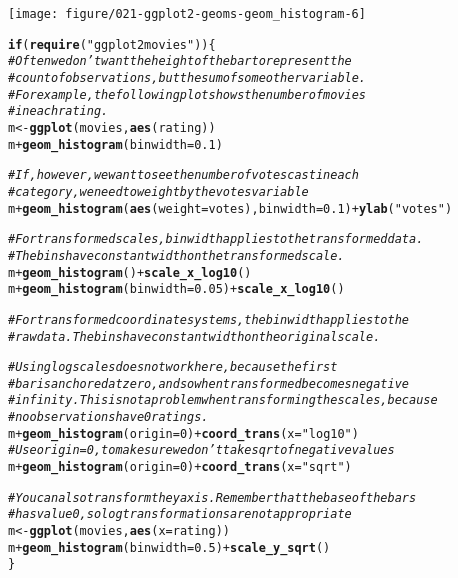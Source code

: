 \documentclass[a4paper,titlepage]{tufte-handout}\usepackage[]{graphicx}\usepackage[]{color}
\makeatletter
\def\maxwidth{ %
  \ifdim\Gin@nat@width>\linewidth
    \linewidth
  \else
    \Gin@nat@width
  \fi
}
\newcommand{\hlnum}[1]{\textcolor[rgb]{0.686,0.059,0.569}{#1}}%
\newcommand{\hlstr}[1]{\textcolor[rgb]{0.192,0.494,0.8}{#1}}%
\newcommand{\hlcom}[1]{\textcolor[rgb]{0.678,0.584,0.686}{\textit{#1}}}%
\newcommand{\hlopt}[1]{\textcolor[rgb]{0,0,0}{#1}}%
\newcommand{\hlstd}[1]{\textcolor[rgb]{0.345,0.345,0.345}{#1}}%
\newcommand{\hlkwa}[1]{\textcolor[rgb]{0.161,0.373,0.58}{\textbf{#1}}}%
\newcommand{\hlkwb}[1]{\textcolor[rgb]{0.69,0.353,0.396}{#1}}%
\newcommand{\hlkwc}[1]{\textcolor[rgb]{0.333,0.667,0.333}{#1}}%
\newcommand{\hlkwd}[1]{\textcolor[rgb]{0.737,0.353,0.396}{\textbf{#1}}}%
\newenvironment{kframe}{%
 \def\at@end@of@kframe{}%
 \ifinner\ifhmode%
  \def\at@end@of@kframe{\end{minipage}}%
  \begin{minipage}{\columnwidth}%
 \fi\fi%
 \def\FrameCommand##1{\hskip\@totalleftmargin \hskip-\fboxsep
 \colorbox{shadecolor}{##1}\hskip-\fboxsep
     \hskip-\linewidth \hskip-\@totalleftmargin \hskip\columnwidth}%
 \MakeFramed {\advance\hsize-\width
   \@totalleftmargin\z@ \linewidth\hsize
   \@setminipage}}%
 {\par\unskip\endMakeFramed%
 \at@end@of@kframe}
\newenvironment{knitrout}{}{} %
\makeatother
\begin{document}
\begin{knitrout}
\begin{kframe}
\begin{alltt}
\end{alltt}
\end{kframe}
\texttt{[image: figure/021-ggplot2-geoms-geom\_histogram-6]} 
\begin{kframe}\begin{alltt}
\hlkwa{if} \hlstd{(}\hlkwd{require}\hlstd{(}\hlstr{"ggplot2movies"}\hlstd{)) \{}
\hlcom{# Often we don't want the height of the bar to represent the}
\hlcom{# count of observations, but the sum of some other variable.}
\hlcom{# For example, the following plot shows the number of movies}
\hlcom{# in each rating.}
\hlstd{m} \hlkwb{<-} \hlkwd{ggplot}\hlstd{(movies,} \hlkwd{aes}\hlstd{(rating))}
\hlstd{m} \hlopt{+} \hlkwd{geom_histogram}\hlstd{(}\hlkwc{binwidth} \hlstd{=} \hlnum{0.1}\hlstd{)}

\hlcom{# If, however, we want to see the number of votes cast in each}
\hlcom{# category, we need to weight by the votes variable}
\hlstd{m} \hlopt{+} \hlkwd{geom_histogram}\hlstd{(}\hlkwd{aes}\hlstd{(}\hlkwc{weight} \hlstd{= votes),} \hlkwc{binwidth} \hlstd{=} \hlnum{0.1}\hlstd{)} \hlopt{+} \hlkwd{ylab}\hlstd{(}\hlstr{"votes"}\hlstd{)}

\hlcom{# For transformed scales, binwidth applies to the transformed data.}
\hlcom{# The bins have constant width on the transformed scale.}
\hlstd{m} \hlopt{+} \hlkwd{geom_histogram}\hlstd{()} \hlopt{+} \hlkwd{scale_x_log10}\hlstd{()}
\hlstd{m} \hlopt{+} \hlkwd{geom_histogram}\hlstd{(}\hlkwc{binwidth} \hlstd{=} \hlnum{0.05}\hlstd{)} \hlopt{+} \hlkwd{scale_x_log10}\hlstd{()}

\hlcom{# For transformed coordinate systems, the binwidth applies to the}
\hlcom{# raw data. The bins have constant width on the original scale.}

\hlcom{# Using log scales does not work here, because the first}
\hlcom{# bar is anchored at zero, and so when transformed becomes negative}
\hlcom{# infinity. This is not a problem when transforming the scales, because}
\hlcom{# no observations have 0 ratings.}
\hlstd{m} \hlopt{+} \hlkwd{geom_histogram}\hlstd{(}\hlkwc{origin} \hlstd{=} \hlnum{0}\hlstd{)} \hlopt{+} \hlkwd{coord_trans}\hlstd{(}\hlkwc{x} \hlstd{=} \hlstr{"log10"}\hlstd{)}
\hlcom{# Use origin = 0, to make sure we don't take sqrt of negative values}
\hlstd{m} \hlopt{+} \hlkwd{geom_histogram}\hlstd{(}\hlkwc{origin} \hlstd{=} \hlnum{0}\hlstd{)} \hlopt{+} \hlkwd{coord_trans}\hlstd{(}\hlkwc{x} \hlstd{=} \hlstr{"sqrt"}\hlstd{)}

\hlcom{# You can also transform the y axis.  Remember that the base of the bars}
\hlcom{# has value 0, so log transformations are not appropriate}
\hlstd{m} \hlkwb{<-} \hlkwd{ggplot}\hlstd{(movies,} \hlkwd{aes}\hlstd{(}\hlkwc{x} \hlstd{= rating))}
\hlstd{m} \hlopt{+} \hlkwd{geom_histogram}\hlstd{(}\hlkwc{binwidth} \hlstd{=} \hlnum{0.5}\hlstd{)} \hlopt{+} \hlkwd{scale_y_sqrt}\hlstd{()}
\hlstd{\}}
\end{alltt}



\end{kframe}
\end{knitrout}
\end{document}
